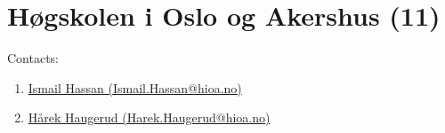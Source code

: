 \section{Høgskolen i Oslo og Akershus (11)}
\label{sec:HiOA}

Contacts:
\begin{enumerate}
 \item {}\href{mailto:Ismail.Hassan@hioa.no}{Ismail Hassan (Ismail.Hassan@hioa.no)}
 \item {}\href{mailto:Harek.Haugerud@hioa.no}{Hårek Haugerud (Harek.Haugerud@hioa.no)}
\end{enumerate}

